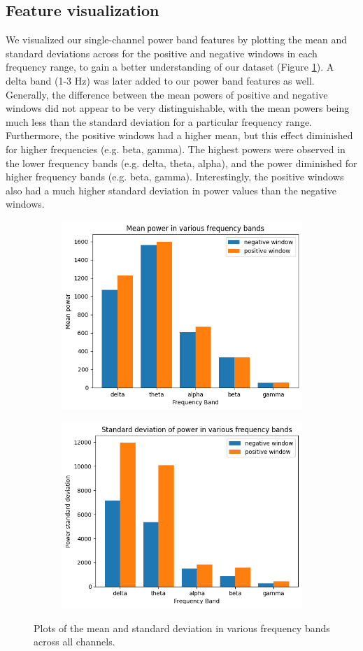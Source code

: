 \documentclass[format=sigconf, nonacm=true, review=true, screen=true]{acmart}
\begin{document}
\subsection{Feature visualization}
We visualized our single-channel power band features by plotting the mean and standard deviations across for the positive and negative windows in each frequency range, to gain a better understanding of our dataset (Figure \ref{fig:barplot_mean_std_visualization}). A delta band (1-3 Hz) was later added to our power band features as well. Generally, the difference between the mean powers of positive and negative windows did not appear to be very distinguishable, with the mean powers being much less than the standard deviation for a particular frequency range. Furthermore, the positive windows had a higher mean, but this effect diminished for higher frequencies (e.g. beta, gamma). The highest powers were observed in the lower frequency bands (e.g. delta, theta, alpha), and the power diminished for higher frequency bands (e.g. beta, gamma). Interestingly, the positive windows also had a much higher standard deviation in power values than the negative windows.

\begin{figure}[H]
     \centering
     \begin{subfigure}
         \centering
         \includegraphics[width=0.48\columnwidth]{figures/bar-power-all-mean.png}
     \end{subfigure}
     \begin{subfigure}
         \centering
         \includegraphics[width=0.48\columnwidth]{figures/bar-power-all-stdev.png}
     \end{subfigure}
     \caption{Plots of the mean and standard deviation in various frequency bands across all channels.}
     \label{fig:barplot_mean_std_visualization}
\end{figure}
\end{document}
